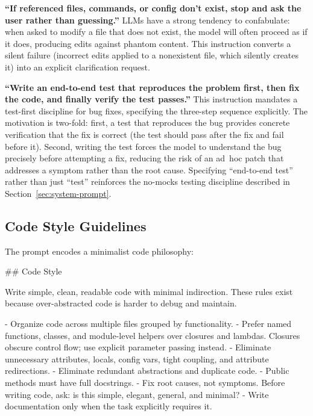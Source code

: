\documentclass{article}
\begin{document}
\textbf{``If referenced files, commands, or config don't exist, stop and ask the user rather than guessing.''}  LLMs have a strong tendency to confabulate: when asked to modify a file that does not exist, the model will often proceed as if it does, producing edits against phantom content.  This instruction converts a silent failure (incorrect edits applied to a nonexistent file, which silently creates it) into an explicit clarification request.

\textbf{``Write an end-to-end test that reproduces the problem first, then fix the code, and finally verify the test passes.''}  This instruction mandates a test-first discipline for bug fixes, specifying the three-step sequence explicitly.  The motivation is two-fold: first, a test that reproduces the bug provides concrete verification that the fix is correct (the test should pass after the fix and fail before it).  Second, writing the test forces the model to understand the bug precisely before attempting a fix, reducing the risk of an ad~hoc patch that addresses a symptom rather than the root cause.  Specifying ``end-to-end test'' rather than just ``test'' reinforces the no-mocks testing discipline described in Section~\ref{sec:system-prompt}.

\subsection{Code Style Guidelines}

The prompt encodes a minimalist code philosophy:

\begin{prompt}
## Code Style

Write simple, clean, readable code with minimal
indirection. These rules exist because over-abstracted
code is harder to debug and maintain.

- Organize code across multiple files grouped by
  functionality.
- Prefer named functions, classes, and module-level
  helpers over closures and lambdas. Closures obscure
  control flow; use explicit parameter passing instead.
- Eliminate unnecessary attributes, locals, config vars,
  tight coupling, and attribute redirections.
- Eliminate redundant abstractions and duplicate code.
- Public methods must have full docstrings.
- Fix root causes, not symptoms. Before writing code,
  ask: is this simple, elegant, general, and minimal?
- Write documentation only when the task explicitly
  requires it.
\end{prompt}
\end{document}
